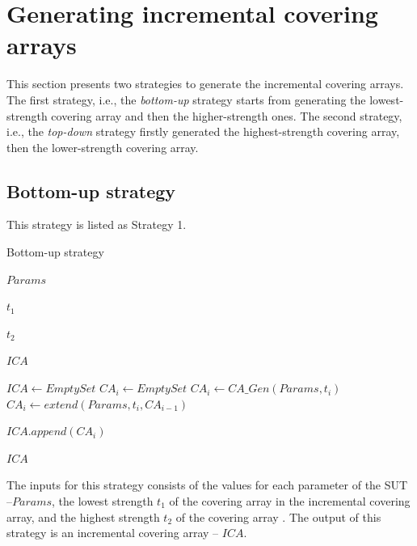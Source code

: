 \documentclass[conference]{IEEEtran}
\theoremstyle{definition}
\begin{document}
\section{Generating incremental covering arrays}
This section presents two strategies to generate the incremental covering arrays. The first strategy, i.e., the \emph{bottom-up} strategy starts from generating the lowest-strength covering array and then the higher-strength ones. The second strategy, i.e., the  \emph{top-down} strategy firstly generated the highest-strength covering array, then the lower-strength covering array.

\subsection{Bottom-up strategy}
This strategy is listed as Strategy 1.
\begin{algorithm}
  \caption{Bottom-up strategy}
  \begin{algorithmic}[1]
     \Require
     $Params$ 

     $t_{1}$ 

     $t_{2}$ 

     \Ensure  $ICA$ 

      \State $ICA \leftarrow Empty Set$
         \State $CA_{i} \leftarrow  Empty Set $
                \State $CA_{i} \leftarrow CA\_Gen(Params, t_{i})$
         \Else
             \State $CA_{i} \leftarrow extend(Params, t_{i}, CA_{i - 1})$
        \EndIf

        \State $ICA.append(CA_{i})$
      \EndFor

     \State \Return $ICA$
  \end{algorithmic}
\end{algorithm}
The inputs for this strategy consists of the values for each parameter of the SUT --$Params$,  the lowest strength $t_{1}$ of the covering array in the incremental covering array, and the highest strength $t_{2}$ of the covering array . The output of this strategy is an incremental covering array -- $ICA$.
\end{document}
